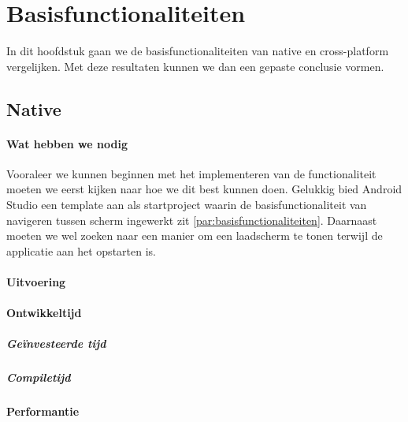 
\chapter{Basisfunctionaliteiten}%
\label{ch:basisfunctionaliteiten}

In dit hoofdstuk gaan we de basisfunctionaliteiten van native en cross-platform vergelijken. 
Met deze resultaten kunnen we dan een gepaste conclusie vormen.

\section{Native}
\subsubsection{Wat hebben we nodig}
Vooraleer we kunnen beginnen met het implementeren van de functionaliteit moeten we eerst kijken naar hoe we dit best kunnen doen. 
Gelukkig bied Android Studio een template aan als startproject waarin de basisfunctionaliteit van navigeren tussen scherm ingewerkt 
zit \ref{par:basisfunctionaliteiten}. Daarnaast moeten we wel zoeken naar een manier om een laadscherm te tonen terwijl de applicatie 
aan het opstarten is.

\subsubsection{Uitvoering}

\subsubsection{Ontwikkeltijd}

\paragraph{Geïnvesteerde tijd}

\paragraph{Compiletijd}

\subsubsection{Performantie}

